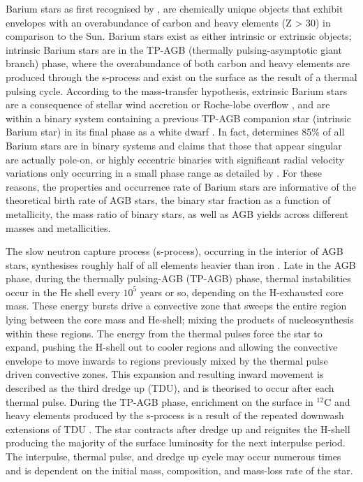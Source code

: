 \documentclass[a4paper,fleqn,usenatbib]{mnras}
\begin{document}
Barium stars as first recognised by \citet{Bidelman1951}, are chemically unique objects that exhibit envelopes with an overabundance of carbon and heavy elements (Z > 30) in comparison to the Sun. Barium stars exist as either intrinsic or extrinsic objects; intrinsic Barium stars are in the TP-AGB (thermally pulsing-asymptotic giant branch) phase, where the overabundance of both carbon and heavy elements are produced through the s-process and exist on the surface as the result of a thermal pulsing cycle. According to the mass-transfer hypothesis, extrinsic Barium stars are a consequence of stellar wind accretion \citep{boffin1988,jorissen1992} or Roche-lobe overflow \citep{webbink1986}, and are within a binary system containing a previous TP-AGB companion star (intrinsic Barium star) in its final phase as a white dwarf \citep{bohm1980,bohm1984}. In fact, \citet{mcclure1983} determines 85\% of all Barium stars are in binary systems and claims that those that appear singular are actually pole-on, or highly eccentric binaries with significant radial velocity variations only occurring in a small phase range as detailed by \citet{pourbaix2004}. For these reasons, the properties and occurrence rate of Barium stars are informative of the theoretical birth rate of AGB stars, the binary star fraction as a function of metallicity, the mass ratio of binary stars, as well as AGB yields across different masses and metallicities. 

The slow neutron capture process (s-process), occurring in the interior of AGB stars, synthesises roughly half of all elements heavier than iron \citep[e.g.,][]{busso1999,travaglio2001,herwig2005,romano2010,kobayashi2011,prantzos2012,bisterzo2014,karakas12016}. Late in the AGB phase, during the thermally pulsing-AGB (TP-AGB) phase, thermal instabilities occur in the He shell every $10^5$ years or so, depending on the H-exhausted core mass. These energy bursts drive a convective zone that sweeps the entire region lying between the core mass and He-shell; mixing the products of nucleosynthesis within these regions. The energy from the thermal pulses force the star to expand, pushing the H-shell out to cooler regions and allowing the convective envelope to move inwards to regions previously mixed by the thermal pulse driven convective zones. This expansion and resulting inward movement is described as the third dredge up (TDU), and is theorised to occur after each thermal pulse. During the TP-AGB phase, enrichment on the surface in $^{12}$C and heavy elements produced by the s-process is a result of the repeated downwash extensions of TDU \citep[e.g.,][]{busso2001}. The star contracts after dredge up and reignites the H-shell producing the majority of the surface luminosity for the next interpulse period. The interpulse, thermal pulse, and dredge up cycle may occur numerous times and is dependent on the initial mass, composition, and mass-loss rate of the star.
\end{document}
